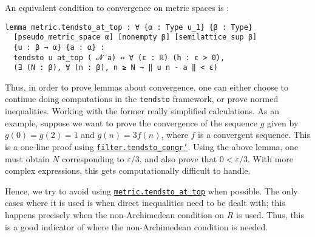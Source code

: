 \documentclass[a4paper,UKenglish,cleveref, autoref, thm-restate,pdfa]{lipics-v2021}
\newcommand{\lean}[1]{\texttt{#1}\xspace} %
\begin{document}
An equivalent condition to convergence on metric spaces is : 
\begin{lstlisting}
lemma metric.tendsto_at_top : ∀ {α : Type u_1} {β : Type} 
  [pseudo_metric_space α] [nonempty β] [semilattice_sup β] 
  {u : β → α} {a : α} : 
  tendsto u at_top ( 𝓝 a) ↔ ∀ (ε : ℝ) (h : ε > 0), 
  (∃ (N : β), ∀ (n : β), n ≥ N → ‖ u n - a ‖ < ε)
\end{lstlisting}
Thus, in order to prove lemmas about convergence, one can either choose to continue doing computations in the \lean{tendsto} framework, 
or prove normed inequalities. Working with the former really simplified 
calculations. %
As an example, suppose we want to prove the convergence of the sequence $g$ given by $g(0) = g(2) = 1$ and $g(n) = 3 f(n)$, 
where $f$ is a convergent sequence. This is a one-line proof using \href{https://leanprover-community.github.io/mathlib_docs/order/filter/basic.html#filter.tendsto_congr%27}{\lean{filter.tendsto\_congr'}}. 
Using the above lemma, one must obtain $N$ corresponding to $\varepsilon / 3$, and also prove that $0 < \varepsilon / 3$. 
With more complex expressions, this gets computationally difficult to handle. %

Hence, we try to avoid using \href{https://leanprover-community.github.io/mathlib_docs/topology/metric_space/basic.html#metric.tendsto_at_top}{\lean{metric.tendsto\_at\_top}} 
when possible. The only cases where it is used is when direct inequalities 
need to be dealt with; this happens precisely when the non-Archimedean condition on $R$ is used. Thus, this is a good 
indicator of where the non-Archimedean condition is needed.
\end{document}
